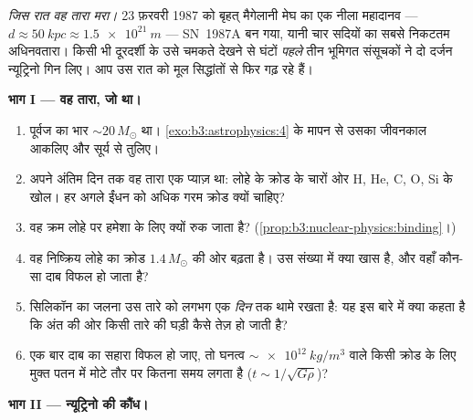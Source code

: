 \begin{problem}\label{pb:b3:astrophysics:1}
\emph{जिस रात वह तारा मरा।} 23 फ़रवरी 1987 को बृहत् मैगेलानी मेघ का
एक नीला महादानव --- $d \approx
\qty{50}{kpc} \approx \qty{1.5e21}{m}$ --- SN~1987A बन गया, यानी
चार सदियों का सबसे निकटतम अधिनवतारा। किसी भी दूरदर्शी के उसे चमकते
देखने से घंटों \emph{पहले} तीन भूमिगत संसूचकों ने
दो दर्जन न्यूट्रिनो गिन लिए। आप उस रात को मूल सिद्धांतों से फिर
गढ़ रहे हैं।

\medskip\noindent\textbf{भाग I --- वह तारा, जो था।}

\begin{enumerate}
  \item पूर्वज का भार ${\sim}20\,M_\odot$ था।
        \cref{exo:b3:astrophysics:4} के मापन से उसका
        जीवनकाल आकलिए और सूर्य से तुलिए।
  \item अपने अंतिम दिन तक वह तारा एक प्याज़ था: लोहे के क्रोड के
        चारों ओर H, He, C, O, Si के खोल। हर अगले
        ईंधन को अधिक गरम क्रोड क्यों चाहिए?
  \item वह क्रम लोहे पर हमेशा के लिए क्यों रुक जाता है?
        (\cref{prop:b3:nuclear-physics:binding}।)
  \item वह निष्क्रिय लोहे का क्रोड $1.4\,M_\odot$ की ओर बढ़ता है।
        उस संख्या में क्या खास है, और वहाँ कौन-सा दाब विफल
        हो जाता है?
  \item सिलिकॉन का जलना उस तारे को लगभग एक \emph{दिन} तक थामे
        रखता है: यह इस बारे में क्या कहता है कि अंत की ओर किसी तारे
        की घड़ी कैसे तेज़ हो जाती है?
  \item एक बार दाब का सहारा विफल हो जाए, तो घनत्व
        $\sim\qty{e12}{kg/m^3}$ वाले किसी क्रोड के लिए मुक्त पतन में
        मोटे तौर पर कितना समय लगता है ($t \sim 1/\sqrt{G\rho}$)?
\end{enumerate}

\medskip\noindent\textbf{भाग II --- न्यूट्रिनो की कौंध।}


\end{problem}
